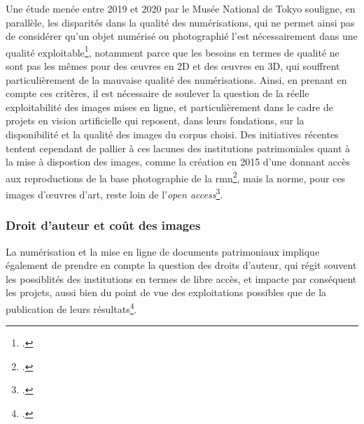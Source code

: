 	Une étude menée entre 2019 et 2020 par le Musée National de Tokyo souligne, en parallèle, les disparités dans la qualité des numérisations, qui ne permet ainsi pas de considérer qu'un objet numérisé ou photographié l'est nécessairement dans une qualité exploitable\footcite{sakaiDigitizingDisparityMuseum2021}, notamment parce que les besoins en termes de qualité ne sont pas les mêmes pour des œuvres en 2D et des œuvres en 3D, qui souffrent particulièrement de la mauvaise qualité des numérisations. Ainsi, en prenant en compte ces critères, il est nécessaire de soulever la question de la réelle exploitabilité des images mises en ligne, et particulièrement dans le cadre de projets en vision artificielle qui reposent, dans leurs fondations, sur la disponibilité et la qualité des images du corpus choisi. Des initiatives récentes tentent cependant de pallier à ces lacunes des institutions patrimoniales quant à la mise à dispostion des images, comme la création en 2015 d'une \api donnant accès aux reproductions de la base photographie de la \acrshort{rmn}\footcite{APIRMNGrandPalais}, mais la norme, pour ces images d'œuvres d'art, reste loin de l'\textit{open access}\footcite{mancaNouveauxDefisAgences2018}. 

    \subsubsection{Droit d'auteur et coût des images}
	La numérisation et la mise en ligne de documents patrimoniaux implique également de prendre en compte la question des droits d'auteur, qui régit souvent les possiblités des institutions en termes de libre accès, et impacte par conséquent les projets, aussi bien du point de vue des exploitations possibles que de la publication de leurs résultats\footcite{jacquotDecrireTranscrireDiffuser2017}. 
	
